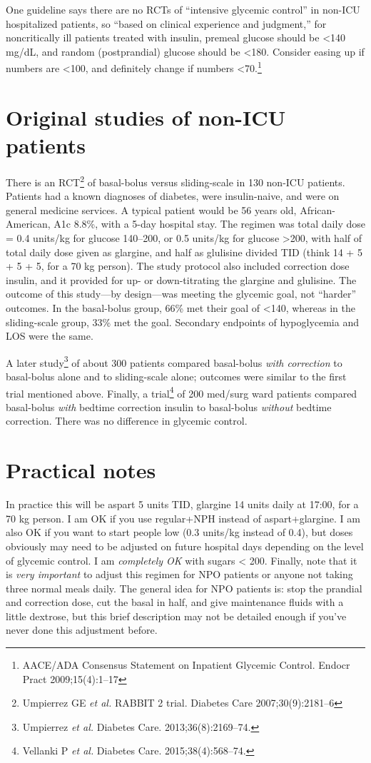\documentclass{tufte-handout}
\begin{document}
One guideline says there are no RCTs of ``intensive glycemic control''
in non-ICU hospitalized patients, so ``based on clinical experience
and judgment,'' for noncritically ill patients treated with insulin,
premeal glucose should be <140 mg/dL, and random (postprandial)
glucose should be <180. Consider easing up if numbers are <100, and
definitely change if numbers <70.\footnote{AACE/ADA Consensus
  Statement on Inpatient Glycemic Control. Endocr Pract
  2009;15(4):1--17}

\section{Original studies of non-ICU patients}

There is an RCT\footnote{Umpierrez GE \emph{et al.} RABBIT 2 trial.
  Diabetes Care 2007;30(9):2181--6} of basal-bolus versus
sliding-scale in 130 non-ICU patients. Patients had a known diagnoses
of diabetes, were insulin-naive, and were on general medicine
services. A typical patient would be 56 years old, African-American,
A1c 8.8\%, with a 5-day hospital stay. The regimen was total daily
dose = 0.4 units/kg for glucose 140--200, or 0.5 units/kg for glucose
>200, with half of total daily dose given as glargine, and half as
glulisine divided TID (think 14 + 5 + 5 + 5, for a 70 kg person). The
study protocol also included correction dose insulin, and it provided
for up- or down-titrating the glargine and glulisine. The outcome of
this study---by design---was meeting the glycemic goal, not ``harder''
outcomes. In the basal-bolus group, 66\% met their goal of <140,
whereas in the sliding-scale group, 33\% met the goal. Secondary
endpoints of hypoglycemia and LOS were the same.

A later study\footnote{Umpierrez \emph{et al.} Diabetes Care.
  2013;36(8):2169--74.} of about 300 patients compared
basal-bolus \emph{with correction} to basal-bolus alone and to
sliding-scale alone; outcomes were similar to the first trial
mentioned above. Finally, a trial\footnote{Vellanki P \emph{et al.}
  Diabetes Care. 2015;38(4):568--74.} of 200 med/surg ward patients
compared basal-bolus \emph{with} bedtime correction insulin to
basal-bolus \emph{without} bedtime correction. There was no difference
in glycemic control.

\section{Practical notes}

In practice this will be aspart 5 units TID, glargine 14 units daily
at 17:00, for a 70 kg person. I am OK if you use regular+NPH instead
of aspart+glargine. I am also OK if you want to start people low (0.3
units/kg instead of 0.4), but doses obviously may need to be adjusted
on future hospital days depending on the level of glycemic control. I
am \emph{completely OK} with sugars < 200. Finally, note that it is
\emph{very important} to adjust this regimen for NPO patients or
anyone not taking three normal meals daily. The general idea for NPO
patients is: stop the prandial and correction dose, cut the basal in
half, and give maintenance fluids with a little dextrose, but this
brief description may not be detailed enough if you've never done this
adjustment before.
\end{document}
